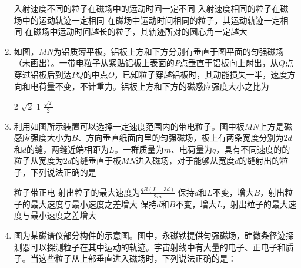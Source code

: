 \begin{enumerate}
\fourchoices
{入射速度不同的粒子在磁场中的运动时间一定不同}
{入射速度相同的粒子在磁场中的运动轨迹一定相同}
{在磁场中运动时间相同的粒子，其运动轨迹一定相同}
{在磁场中运动时间越长的粒子，其轨迹所对的圆心角一定越大}





\item
{}
如图，$ MN $为铝质薄平板，铝板上方和下方分别有垂直于图平面的匀强磁场（未画出）。一带电粒子从紧贴铝板上表面的$ P $点垂直于铝板向上射出，从$ Q $点穿过铝板后到达$ PQ $的中点$ O $，已知粒子穿越铝板时，其动能损失一半，速度方向和电荷量不变，不计重力。铝板上方和下方的磁感应强度大小之比为  
\begin{figure}[h!]
\centering

\end{figure}


\fourchoices
{2}
{$\sqrt{2}$}
{$ 1 $}
{$ \frac{\sqrt{2}}{2} $}






\item
{}
利用如图所示装置可以选择一定速度范围内的带电粒子。图中板$ MN $上方是磁感应强度大小为$ B $、方向垂直纸面向里的匀强磁场，板上有两条宽度分别为$ 2d $和$ d $的缝，两缝近端相距为$ L $。一群质量为$ m $、电荷量为$ q $，具有不同速度的的粒子从宽度为$ 2d $的缝垂直于板$ MN $进入磁场，对于能够从宽度$ d $的缝射出的粒子，下列说法正确的是  
\begin{figure}[h!]
\centering

\end{figure}



\fourchoices
{粒子带正电}
{射出粒子的最大速度为$\frac { q B ( L + 3 d ) } { 2 m }$}
{保持$ d $和$ L $不变，增大$ B $，射出粒子的最大速度与最小速度之差增大}
{保持$ d $和$ B $不变，增大$ L $，射出粒子的最大速度与最小速度之差增大}



\item
{}
图为某磁谱仪部分构件的示意图。图中，永磁铁提供匀强磁场，硅微条径迹探测器可以探测粒子在其中运动的轨迹。宇宙射线中有大量的电子、正电子和质子。当这些粒子从上部垂直进入磁场时，下列说法正确的是：  
\begin{figure}[h!]
\centering

\end{figure}



\end{enumerate}

